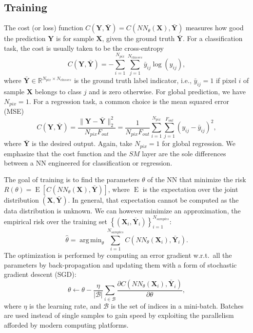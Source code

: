 \documentclass[final,twocolumn,3p,times,sort&compress]{elsarticle}
\renewcommand{\b}[1]{{\bm{#1}}}   %
\newcommand{\1}{\b{1}}              %
\newcommand{\0}{\b{0}}              %
\newcommand{\B}{\mathcal{B}}
\newcommand{\X}{\b{X}}
\newcommand{\Y}{\b{Y}}
\newcommand{\R}{\mathbb{R}}
\DeclareMathOperator*{\esp}{E}
\DeclareMathOperator*{\argmin}{arg \, min}
\begin{document}
\subsection{Training}

The cost (or loss) function $C(\Y, \bar \Y) = C(NN_\theta(\X), \bar \Y)$ measures how good the prediction $\Y$ is for sample $\X$, given the ground truth $\bar \Y$. For a classification task, the cost is usually taken to be the cross-entropy
\begin{equation*}
	C(\Y, \bar \Y) = - \sum_{i=1}^{N_{pix}} \sum_{j=1}^{N_{classes}} \bar y_{ij} \log(y_{ij}),
\end{equation*}
where $\bar \Y \in \R^{N_{pix} \times N_{classes}}$ is the ground truth label indicator, i.e., $\bar y_{ij} = 1$ if pixel $i$ of sample $\X$ belongs to class $j$ and is zero otherwise.
For global prediction, we have $N_{pix} = 1$.
For a regression task, a common choice is the mean squared error (MSE)
\begin{equation*}
	C(\Y, \bar \Y) = \frac{\|\Y-\bar{\Y}\|_2^2}{N_{pix} F_{out}} = \frac{1}{N_{pix} F_{out}} \sum_{i=1}^{N_{pix}} \sum_{j=1}^{F_{out}} (y_{ij} - \bar y_{ij})^2,
\end{equation*}
where $\bar{\Y}$ is the desired output. Again, take $N_{pix} = 1$ for global regression. We emphasize that the cost function and the $SM$ layer are the sole differences between a NN engineered for classification or regression.

The goal of training is to find the parameters $\theta$ of the NN that minimize the risk $R(\theta) = \esp \left[ C \left( NN_\theta(\X), \bar \Y \right) \right]$, where $\esp$ is the expectation over the joint distribution $(\X, \bar \Y)$.
In general, that expectation cannot be computed as the data distribution is unknown. We can however minimize an approximation, the empirical risk over the training set $\left\{ \left( \X_i, \bar \Y_i \right) \right\}_{i=1}^{N_{samples}}$:
\begin{equation*}
	\hat{\theta} = \argmin_\theta \sum_{i=1}^{N_{samples}} C \left(NN_\theta(\X_i), \bar \Y_i \right).
\end{equation*}
The optimization is performed by computing an error gradient w.r.t.\ all the parameters by back-propagation and updating them with a form of stochastic gradient descent (SGD):
\begin{equation*}
	\theta \leftarrow \theta - \frac{\eta}{|\B|} \sum_{i \in \B} \frac{\partial C \left( NN_\theta(\X_i), \bar \Y_i \right)}{\partial \theta} ,
\end{equation*}
where $\eta$ is the learning rate, and $\B$ is the set of indices in a mini-batch. Batches are used instead of single samples to gain speed by exploiting the parallelism afforded by modern computing platforms.
\end{document}
